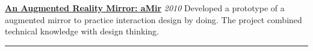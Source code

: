 \documentclass[10pt]{article}
\begin{document}
\href{http://azarbakht.info/augmentedmirror/indexce51.html?/amir/}{\textbf{An Augmented Reality Mirror: aMir}} \hfill \textit{2010}\newline
Developed a prototype of a augmented mirror to practice interaction design by doing. The project combined technical knowledge with design thinking.






\hrule
\end{document}
